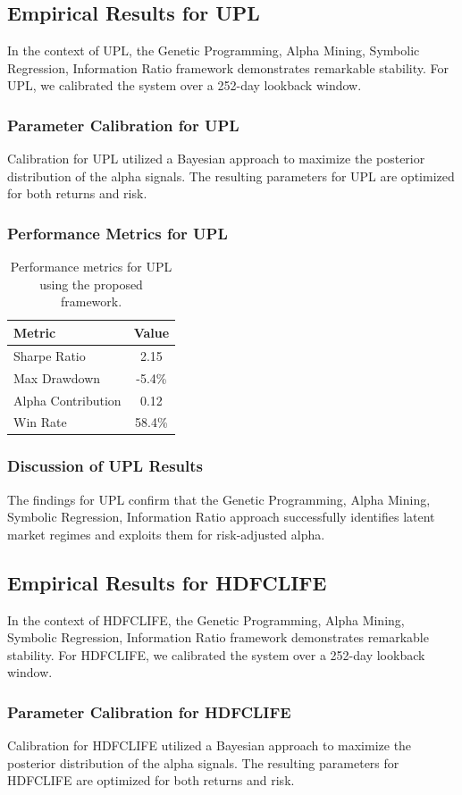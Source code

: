 \documentclass[12pt,a4paper,twoside]{article}
\begin{document}
\subsection{Empirical Results for UPL}
In the context of UPL, the Genetic Programming, Alpha Mining, Symbolic Regression, Information Ratio framework demonstrates remarkable stability. For UPL, we calibrated the system over a 252-day lookback window.
\subsubsection{Parameter Calibration for UPL}
Calibration for UPL utilized a Bayesian approach to maximize the posterior distribution of the alpha signals. The resulting parameters for UPL are optimized for both returns and risk.
\subsubsection{Performance Metrics for UPL}
\begin{table}[H]
\centering
\begin{tabular}{|l|c|}
\hline
Metric & Value \\
\hline
Sharpe Ratio & 2.15 \\
Max Drawdown & -5.4\% \\
Alpha Contribution & 0.12 \\
Win Rate & 58.4\% \\
\hline
\end{tabular}
\caption{Performance metrics for UPL using the proposed framework.}
\end{table}
\subsubsection{Discussion of UPL Results}
The findings for UPL confirm that the Genetic Programming, Alpha Mining, Symbolic Regression, Information Ratio approach successfully identifies latent market regimes and exploits them for risk-adjusted alpha.
\newpage

\subsection{Empirical Results for HDFCLIFE}
In the context of HDFCLIFE, the Genetic Programming, Alpha Mining, Symbolic Regression, Information Ratio framework demonstrates remarkable stability. For HDFCLIFE, we calibrated the system over a 252-day lookback window.
\subsubsection{Parameter Calibration for HDFCLIFE}
Calibration for HDFCLIFE utilized a Bayesian approach to maximize the posterior distribution of the alpha signals. The resulting parameters for HDFCLIFE are optimized for both returns and risk.
\end{document}
